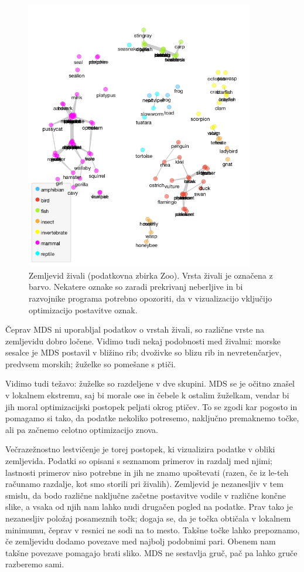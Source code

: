 \begin{figure}[tbp]
\begin{center}
\includegraphics[width=10cm]{slike/zoo-mds.png}
\caption{Zemljevid živali (podatkovna zbirka Zoo). Vrsta živali je označena z barvo. Nekatere oznake so zaradi prekrivanj neberljive in bi razvojnike programa potrebno opozoriti, da v vizualizacijo vključijo optimizacijo postavitve oznak.}
\label{f-zoo-mds}
\end{center}
\end{figure}

Čeprav MDS ni uporabljal podatkov o vrstah živali, so različne vrste na zemljevidu dobro ločene. Vidimo tudi nekaj podobnosti med živalmi: morske sesalce je MDS postavil v bližino rib; dvoživke so blizu rib in nevretenčarjev, predvsem morskih; žuželke so pomešane s ptiči.

Vidimo tudi težavo: žuželke so razdeljene v dve skupini. MDS se je očitno znašel v lokalnem ekstremu, saj bi morale ose in čebele k ostalim žuželkam, vendar bi jih moral optimizacijski postopek peljati okrog ptičev. To se zgodi kar pogosto in pomagamo si tako, da podatke nekoliko potresemo, naključno premaknemo točke, ali pa začnemo celotno optimizacijo znova.

Večrazežnostno lestvičenje je torej postopek, ki vizualizira podatke v obliki zemljevida. Podatki so opisani s seznamom primerov in razdalj med njimi; lastnosti primerov niso potrebne in jih ne znamo upoštevati (razen, če iz le-teh računamo razdalje, kot smo storili pri živalih). Zemljevid je nezanesljiv v tem smislu, da bodo različne naključne začetne postavitve vodile v različne končne slike, a vsaka od njih nam lahko nudi drugačen pogled na podatke. Prav tako je nezanesljiv položaj posameznih točk; dogaja se, da je točka obtičala v lokalnem minimumu, čeprav v resnici ne sodi na to mesto. Takšne točke lahko prepoznamo, če zemljevidu dodamo povezave med najbolj podobnimi pari. Obenem nam takšne povezave pomagajo brati sliko. MDS ne sestavlja gruč, pač pa lahko gruče razberemo sami.

